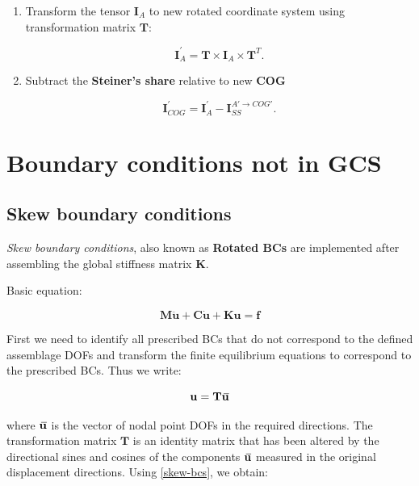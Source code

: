 \documentclass[10pt,b5paper,titlepage]{book}
\newcommand{\m}{\mathbf}
\newcommand{\closure}[2][3]{%
{}\mkern#1mu\overline{\mkern-#1mu#2}}
\begin{document}
\begin{itemize}
\begin{enumerate}
            \item Transform the tensor $\mathbf{I}_{A}$ to new rotated coordinate
                system using transformation matrix $\mathbf{T}$:

                \begin{equation}
                    \mathbf{I}_{A}^{'} = \mathbf{T} \times \mathbf{I}_{A} \times \mathbf{T}^{T}
                .\end{equation}

            \item Subtract the \textbf{Steiner's share} relative to new \textbf{COG}

                \begin{equation}
                    \mathbf{I}_{COG}^{'} = \mathbf{I}_{A}^{'} - \mathbf{I}_{SS}^{A' \to COG'}
                .\end{equation}

        \end{enumerate}



\end{itemize}


\newpage
\chapter{Boundary conditions not in GCS}

\section{Skew boundary conditions}
\textit{Skew boundary conditions}, also known as \textbf{Rotated BCs} are implemented
after assembling the global stiffness matrix $ \m{K} $.

Basic equation:

\begin{equation}
    \m{M} \ddot{\m{u}} + \m{C} \dot{\m{u}} + \m{K} \m{u}
    = \m{f}
\end{equation}

First we need to identify all prescribed BCs that do not correspond to the
defined assemblage DOFs and transform the finite equilibrium equations to
correspond to the prescribed BCs. Thus we write:

\begin{equation}\label{skew-bcs}
    \m{u} = \m{T} \closure{\m{u}}
\end{equation}

where $ \closure{\m{u}} $ is the vector of nodal point DOFs in the required
directions. The transformation matrix $ \m{T} $ is an identity matrix
that has been altered by the directional sines and cosines of the components
$ \closure{\m{u}} $ measured in the original displacement directions.
Using \eqref{skew-bcs}, we obtain:
\end{document}
